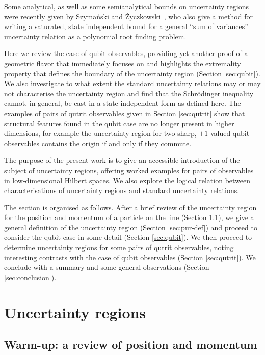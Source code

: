 Some analytical, as well as some semianalytical bounds on uncertainty regions were recently given by Szymański and \.{Z}yczkowski~\cite{SzymanskiZyczkowski2018}, who also give a method for writing a saturated, state independent bound for a general ``sum of variances'' uncertainty relation as a polynomial root finding problem.

Here we review the case of qubit observables, providing yet another proof of a geometric flavor that immediately focuses on and highlights the extremality property that defines the boundary of the uncertainty region (Section \ref{sec:qubit}). We also investigate to what extent the standard uncertainty relations may or may not characterise the uncertainty region and find that the Schr\"odinger inequality cannot, in general, be cast in a state-independent form as defined here. The examples of pairs of qutrit observables given in Section \ref{sec:qutrit} show that structural features found in the qubit case are no longer present in higher dimensions, for example the uncertainty region for two sharp, $\pm 1$-valued qubit observables contains the origin if and only if they commute.

The purpose of the present work is to give an accessible introduction of the subject of uncertainty regions, offering worked examples for pairs of observables in low-dimensional Hilbert spaces. We also explore the logical relation between characterisations of uncertainty regions and standard uncertainty relations.

The section is organised as follows. After a brief review of the uncertainty region for the position and momentum of a particle on the line (Section \ref{sec:qp}), we give a general definition of the uncertainty region (Section \ref{sec:pur-def}) and proceed to consider the qubit case in some detail (Section \ref{sec:qubit}). We then proceed to determine uncertainty regions for some pairs of qutrit observables, noting interesting contrasts with the case of qubit observables (Section \ref{sec:qutrit}). We conclude with a summary and some general observations (Section \ref{sec:conclusion}).

\section{Uncertainty regions}

\subsection{Warm-up: a review of position and momentum}\label{sec:qp}

